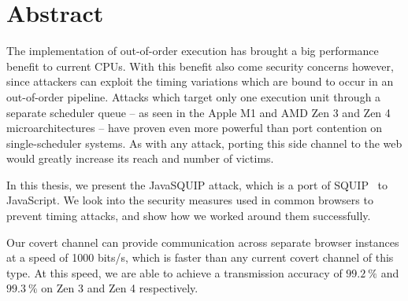 \documentclass[11pt,
  titlepage=false,
  parskip=half,      %
]{scrreprt}
\begin{document}





\supervisortitle{}


\printthesistitle

\chapter*{\centering\Large Abstract}
\label{ch:abstract}
The implementation of out-of-order execution has brought a big performance benefit to current CPUs.
With this benefit also come security concerns however, since attackers can exploit the timing variations which are bound to occur in an out-of-order pipeline.
Attacks which target only one execution unit through a separate scheduler queue -- as seen in the Apple M1 and AMD Zen 3 and Zen 4 microarchitectures -- have proven even more powerful than port contention on single-scheduler systems.
As with any attack, porting this side channel to the web would greatly increase its reach and number of victims.

In this thesis, we present the JavaSQUIP attack, which is a port of SQUIP~\cite{squip} to JavaScript.
We look into the security measures used in common browsers to prevent timing attacks, and show how we worked around them successfully.

Our covert channel can provide communication across separate browser instances at a speed of 1000 bits/s,
which is faster than any current covert channel of this type.
At this speed, we are able to achieve a transmission accuracy of $99.2~\%$ and $99.3~\%$ on Zen 3 and Zen 4 respectively.
\end{document}
